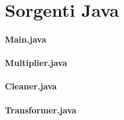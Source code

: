 \chapter{Sorgenti Java}
\subsubsection{Main.java}

\subsubsection{Multiplier.java}

\subsubsection{Cleaner.java}

\subsubsection{Transformer.java}
